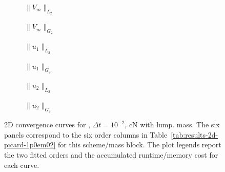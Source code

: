 \begin{figure}[p]
\centering
\begin{subfigure}{0.485\linewidth}
\centering
{}
\caption{$\|V_m\|_{L_2}$}
\label{fig:results-2d-picard-1p0em02-cranknicolson-lumped-a}
\end{subfigure}
\hfill
\begin{subfigure}{0.485\linewidth}
\centering
{}
\caption{$\|V_m\|_{G_2}$}
\label{fig:results-2d-picard-1p0em02-cranknicolson-lumped-b}
\end{subfigure}
\par\vspace{0.8em}
\begin{subfigure}{0.485\linewidth}
\centering
{}
\caption{$\|u_1\|_{L_2}$}
\label{fig:results-2d-picard-1p0em02-cranknicolson-lumped-c}
\end{subfigure}
\hfill
\begin{subfigure}{0.485\linewidth}
\centering
{}
\caption{$\|u_1\|_{G_2}$}
\label{fig:results-2d-picard-1p0em02-cranknicolson-lumped-d}
\end{subfigure}
\par\vspace{0.8em}
\begin{subfigure}{0.485\linewidth}
\centering
{}
\caption{$\|u_2\|_{L_2}$}
\label{fig:results-2d-picard-1p0em02-cranknicolson-lumped-e}
\end{subfigure}
\hfill
\begin{subfigure}{0.485\linewidth}
\centering
{}
\caption{$\|u_2\|_{G_2}$}
\label{fig:results-2d-picard-1p0em02-cranknicolson-lumped-f}
\end{subfigure}
\caption{2D convergence curves for , $\Delta t=10^{-2}$, cN with lump. mass. The six panels correspond to the six order columns in Table~\ref{tab:results-2d-picard-1p0em02} for this scheme/mass block. The plot legends report the two fitted orders and the accumulated runtime/memory cost for each curve.}
\label{fig:results-2d-picard-1p0em02-cranknicolson-lumped}
\end{figure}
\FloatBarrier

